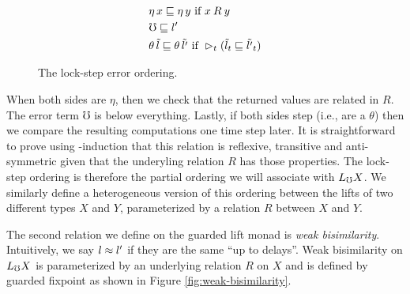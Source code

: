 \begin{figure}
    \begin{align*}
        &\eta\, x \sqsubseteq \eta\, y \text{ if } 
            x \mathbin{R} y \\
        &\mho \sqsubseteq l' \\
        &\theta\, \tilde{l} \sqsubseteq \theta\, \tilde{l'} \text{ if } 
            \vartriangleright_t (\tilde{l}_t \sqsubseteq \tilde{l'}_t)
    \end{align*}
    \caption{The lock-step error ordering.}
    \label{fig:lock-step-error-ordering}
\end{figure}

When both sides are $\eta$, then we check that the returned values are related
in $R$. The error term $\mho$ is below everything. Lastly, if both sides step
(i.e., are a $\theta$) then we compare the resulting computations one time step
later.
%
It is straightforward to prove using \lob-induction that this relation is
reflexive, transitive and anti-symmetric given that the underyling relation $R$
has those properties. The lock-step ordering is therefore the partial ordering
we will associate with $L_\mho X$.
%
We similarly define a heterogeneous version of this ordering between the lifts
of two different types $X$ and $Y$, parameterized by a relation $R$ between $X$
and $Y$.

The second relation we define on the guarded lift monad is \emph{weak bisimilarity}.
Intuitively, we say $l \approx l'$ if they are the same ``up to delays''.
%
Weak bisimilarity on $L_\mho X$ is parameterized by an underlying relation $R$ on $X$
and is defined by guarded fixpoint as shown in Figure \ref{fig:weak-bisimilarity}.

